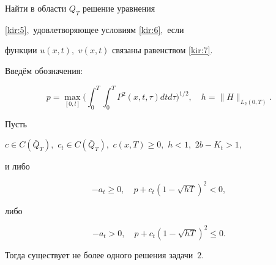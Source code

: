 \smallskip



\begin{task}[2]Найти в области $Q_T$ решение уравнения

\eqref{kir:5}$,$ удовлетворяющее условиям \eqref{kir:6}$,$ если

функции $u(x,t),$ $v(x,t)$ связаны равенством \eqref{kir:7}$.$

\end{task}



\smallskip



Введём обозначения:

$$

p=

\max\limits_{[0, l]}\biggl( \int _0^T \int _0^TP^2(x,t,\tau)dtd\tau

\biggr)^{{1}/{2}}, \quad h=\|H\|_{L_2(0,T)}.

$$



\smallskip



\begin{theorem}[1]Пусть

$  c\in C(\bar Q_T), $ $  c_t\in C(\bar{Q}_T), $ $ c(x,T)\geq 0,$ $h<1,$ $2b-K_t>1,$

и либо

$$

 -a_t\geq 0, \quad p+c_t(1-\sqrt{hT})^2<0,

$$

либо

$$ -a_t>0, \quad p+c_t(1-\sqrt{hT})^2\leq 0.

$$

Тогда существует не более одного решения задачи~$2.$

\end{theorem}



\smallskip



